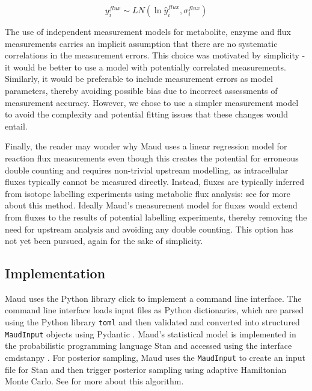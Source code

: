 \documentclass[journal=asbcd6,manuscript=article,layout=traditional]{achemso}
\begin{document}
\begin{equation}
y_i^{flux} \sim LN(\ln{\hat{y}_i^{flux}}, \sigma_i^{flux})\label{eq-yflux}
\end{equation}

The use of independent measurement models for metabolite, enzyme and
flux measurements carries an implicit assumption that there are no
systematic correlations in the measurement errors. This choice was
motivated by simplicity - it would be better to use a model with
potentially correlated measurements. Similarly, it would be preferable
to include measurement errors as model parameters, thereby avoiding
possible bias due to incorrect assessments of measurement accuracy.
However, we chose to use a simpler measurement model to avoid the
complexity and potential fitting issues that these changes would entail.

Finally, the reader may wonder why Maud uses a linear regression model
for reaction flux measurements even though this creates the potential
for erroneous double counting and requires non-trivial upstream
modelling, as intracellular fluxes typically cannot be measured
directly. Instead, fluxes are typically inferred from isotope labelling
experiments using metabolic flux analysis: see
\citet{daiUnderstandingMetabolismFlux2017} for more about this method.
Ideally Maud's measurement model for fluxes would extend from fluxes to
the results of potential labelling experiments, thereby removing the
need for upstream analysis and avoiding any double counting. This option
has not yet been pursued, again for the sake of simplicity.

\hypertarget{implementation}{%
\subsection{Implementation}\label{implementation}}

Maud uses the Python library click
\citep{clickdevelopersClickPythonComposable2022} to implement a command
line interface. The command line interface loads input files as Python
dictionaries, which are parsed using the Python library \texttt{toml}
\citep{pearsonTomlPythonLibrary2020} and then validated and converted
into structured \texttt{MaudInput} objects using Pydantic
\citep{pydanticdevelopersPydantic2022}. Maud's statistical model is
implemented in the probabilistic programming language Stan
\citep{carpenterStanProbabilisticProgramming2017} and accessed using the
interface cmdstanpy \citep{standevelopmentteamCmdStanPy2022}. For
posterior sampling, Maud uses the \texttt{MaudInput} to create an input
file for Stan and then trigger posterior sampling using adaptive
Hamiltonian Monte Carlo. See
\citet{betancourtConceptualIntroductionHamiltonian2018} for more about
this algorithm.
\end{document}
